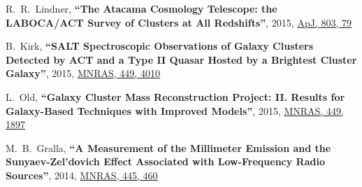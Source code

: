\documentclass{article}
\def\myself{\textbf{\color{red} C.~Sif\'on}}
\def\apj{ApJ}
\def\mnras{MNRAS}
\newcommand{\paper}[1]{\textbf{``#1''}}
\begin{document}
\begin{etaremune}
\item
R.~R.~Lindner, 
\paper{The Atacama Cosmology Telescope: the LABOCA/ACT Survey of Clusters at All Redshifts},
2015, \href{http://adsabs.harvard.edu/adsabs/abs/2015ApJ...803...79L}{\apj, 803, 79}

\item
B.~Kirk, 
\paper{SALT Spectroscopic Observations of Galaxy Clusters Detected by ACT and a Type II Quasar 
Hosted by a Brightest Cluster Galaxy},
2015, \href{http://adsabs.harvard.edu/adsabs/abs/2015MNRAS.449.4010K}{\mnras, 449, 4010}

\item
L.~Old, 
\paper{Galaxy Cluster Mass Reconstruction Project: II. Results for Galaxy-Based Techniques with 
Improved Models},
2015, \href{http://adsabs.harvard.edu/adsabs/abs/2015MNRAS.449.1897O}{\mnras, 449, 1897}

\item
M.~B.~Gralla, 
\paper{A Measurement of the Millimeter Emission and the Sunyaev-Zel'dovich Effect Associated with 
Low-Frequency Radio Sources},
2014, \href{http://adsabs.harvard.edu/adsabs/abs/2014MNRAS.445..460G}{\mnras, 445, 460}


\end{etaremune}
\end{document}
